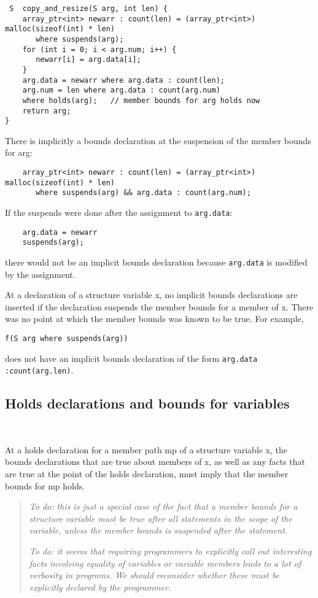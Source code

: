 \begin{verbatim}
 S  copy_and_resize(S arg, int len) {
    array_ptr<int> newarr : count(len) = (array_ptr<int>) malloc(sizeof(int) * len)
       where suspends(arg);
    for (int i = 0; i < arg.num; i++) {
       newarr[i] = arg.data[i];
    }
    arg.data = newarr where arg.data : count(len);
    arg.num = len where arg.data : count(arg.num)
    where holds(arg);   // member bounds for arg holds now
    return arg;
}
\end{verbatim}


There is implicitly a bounds declaration at the suspension of the member
bounds for arg:

\begin{verbatim}
    array_ptr<int> newarr : count(len) = (array_ptr<int>) malloc(sizeof(int) * len)
       where suspends(arg) && arg.data : count(arg.num);
\end{verbatim}

If the suspends were done after the assignment to \texttt{arg.data}:

\begin{verbatim}
    arg.data = newarr
    suspends(arg);
\end{verbatim}

there would not be an implicit bounds declaration because \texttt{arg.data} is
modified by the assignment.

At a declaration of a structure variable x, no implicit bounds
declarations are inserted if the declaration suspends the member bounds
for a member of x. There was no point at which the member bounds was
known to be true. For example,

\begin{verbatim}
f(S arg where suspends(arg))
\end{verbatim}

does not have an implicit bounds declaration of the form \verb|arg.data :count(arg.len)|.

\subsection{Holds declarations and bounds for variables}\

At a holds declaration for a member path mp of a structure variable x,
the bounds declarations that are true about members of x, as well as any
facts that are true at the point of the holds declaration, must imply
that the member bounds for mp holds.

\begin{quote}
\emph{To do: this is just a special case of the fact that a member
bounds for a structure variable must be true after all statements in the
scope of the variable, unless the member bounds is suspended after the
statement. }

\emph{To do: it seems that requiring programmers to explicitly call out
interesting facts involving equality of variables or variable members
leads to a lot of verbosity in programs. We should reconsider whether
these must be explicitly declared by the programmer.}
\end{quote}

